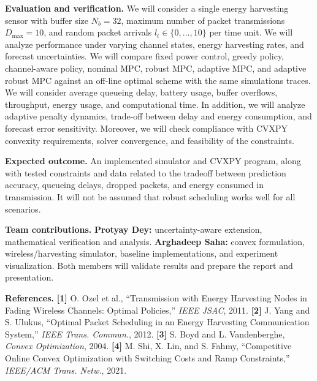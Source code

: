 \documentclass[10pt,letterpaper]{article}
\begin{document}
\textbf{Evaluation and verification.}
We will consider a single energy harvesting sensor with buffer size $N_b=32$, maximum number of packet transmissions $D_{\max}=10$, and random packet arrivals $l_t\in\{0,\ldots,10\}$ per time unit. We will analyze performance under varying channel states, energy harvesting rates, and forecast uncertainties. We will compare fixed power control, greedy policy, channel-aware policy, nominal MPC, robust MPC, adaptive MPC, and adaptive robust MPC against an off-line optimal scheme with the same simulations traces. We will consider average queueing delay, battery usage, buffer overflows, throughput, energy usage, and computational time. In addition, we will analyze adaptive penalty dynamics, trade-off between delay and energy consumption, and forecast error sensitivity. Moreover, we will check compliance with CVXPY convexity requirements, solver convergence, and feasibility of the constraints.

\textbf{Expected outcome.} An implemented simulator and CVXPY program, along with tested constraints and data related to the tradeoff between prediction accuracy, queueing delays, dropped packets, and energy consumed in transmission. It will not be assumed that robust scheduling works well for all scenarios.

\textbf{Team contributions.} \textbf{Protyay Dey:}  uncertainty-aware extension, mathematical verification and analysis. \textbf{Arghadeep Saha:} convex formulation, wireless/harvesting simulator, baseline implementations, and experiment visualization. Both members will validate results and prepare the report and presentation.

\textbf{References.} \textbf{[1]} O. Ozel et al., ``Transmission with Energy Harvesting Nodes in Fading Wireless Channels: Optimal Policies,'' \emph{IEEE JSAC}, 2011. \textbf{[2]} J. Yang and S. Ulukus, ``Optimal Packet Scheduling in an Energy Harvesting Communication System,'' \emph{IEEE Trans. Commun.}, 2012. \textbf{[3]} S. Boyd and L. Vandenberghe, \emph{Convex Optimization}, 2004. \textbf{[4]} M. Shi, X. Lin, and S. Fahmy, ``Competitive Online Convex Optimization with Switching Costs and Ramp Constraints,'' \emph{IEEE/ACM Trans. Netw.}, 2021.
\end{document}

